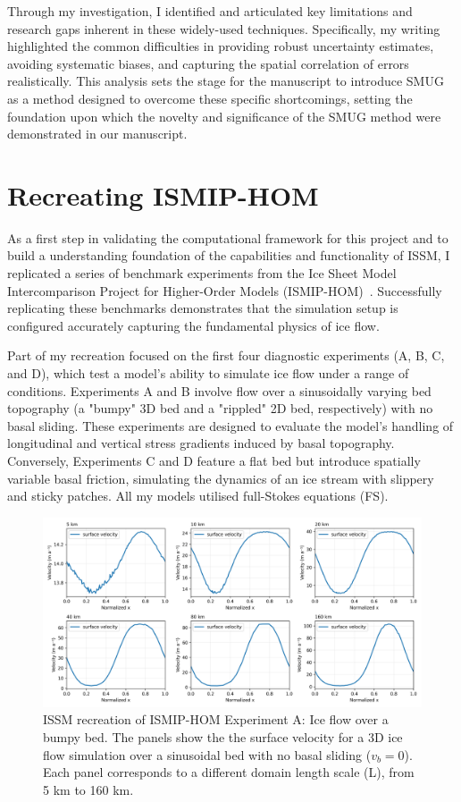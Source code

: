 Through my investigation, I identified and articulated key limitations and research gaps inherent in these widely-used techniques. Specifically, my writing highlighted the common difficulties in providing robust uncertainty estimates, avoiding systematic biases, and capturing the spatial correlation of errors realistically. This analysis sets the stage for the manuscript to introduce SMUG as a method designed to overcome these specific shortcomings, setting the foundation upon which the novelty and significance of the SMUG method were demonstrated in our manuscript. %

\section{Recreating ISMIP-HOM}

As a first step in validating the computational framework for this project and to build a understanding foundation of the capabilities and functionality of ISSM, I replicated a series of benchmark experiments from the Ice Sheet Model Intercomparison Project for Higher-Order Models (ISMIP-HOM)~\cite{Pattyn_2008}. Successfully replicating these benchmarks demonstrates that the simulation setup is configured accurately capturing the fundamental physics of ice flow.  

Part of my recreation focused on the first four diagnostic experiments (A, B, C, and D), which test a model's ability to simulate ice flow under a range of conditions. Experiments A and B involve flow over a sinusoidally varying bed topography (a "bumpy" 3D bed and a "rippled" 2D bed, respectively) with no basal sliding. These experiments are designed to evaluate the model's handling of longitudinal and vertical stress gradients induced by basal topography. Conversely, Experiments C and D feature a flat bed but introduce spatially variable basal friction, simulating the dynamics of an ice stream with slippery and sticky patches. All my models utilised full-Stokes equations (FS).

\begin{figure}[H]
    \includegraphics[scale=0.45]{ExpA_velocity_panels.png}
    \caption{ISSM recreation of ISMIP-HOM Experiment A: Ice flow over a bumpy bed. The panels show the the surface velocity for a 3D ice flow simulation over a sinusoidal bed with no basal sliding ($v_b=0$). Each panel corresponds to a different domain length scale (L), from 5 km to 160 km.}
    \label{fig:4.1}
\end{figure}

